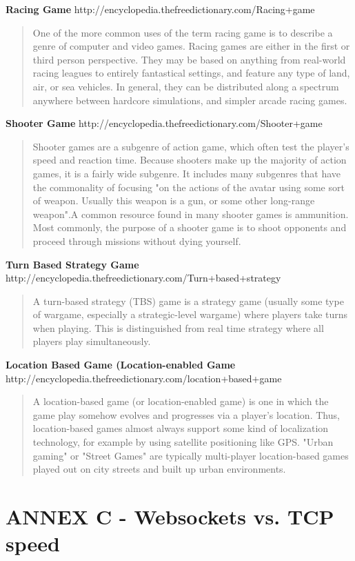 \documentclass{article}
\begin{document}
\textbf{Racing Game}
	http://encyclopedia.thefreedictionary.com/Racing+game
\begin{quote}
One of the more common uses of the term racing game is to describe a genre of
computer and video games. Racing games are either in the first or third person
perspective. They may be based on anything from real-world racing leagues to
entirely fantastical settings, and feature any type of land, air, or sea
vehicles. In general, they can be distributed along a spectrum anywhere between
hardcore simulations, and simpler arcade racing games.
\end{quote}
\textbf{Shooter Game}
	http://encyclopedia.thefreedictionary.com/Shooter+game
\begin{quote}
Shooter games are a subgenre of action game, which often test the player's speed
and reaction time. Because shooters make up the majority of action games, it is
a fairly wide subgenre. It includes many subgenres that have the commonality of
focusing "on the actions of the avatar using some sort of weapon. Usually this
weapon is a gun, or some other long-range weapon".A common resource found in
many shooter games is ammunition. Most commonly, the purpose of a shooter
game is to shoot opponents and proceed through missions without dying yourself.
\end{quote}
	
\textbf{Turn Based Strategy Game}
	http://encyclopedia.thefreedictionary.com/Turn+based+strategy
\begin{quote}
A turn-based strategy (TBS) game is a strategy game (usually some type of
wargame, especially a strategic-level wargame) where players take turns when
playing. This is distinguished from real time strategy where all players play
simultaneously.
\end{quote}

\textbf{Location Based Game (Location-enabled Game}
	http://encyclopedia.thefreedictionary.com/location+based+game
\begin{quote}
A location-based game (or location-enabled game) is one in which the game play
somehow evolves and progresses via a player's location. Thus, location-based
games almost always support some kind of localization technology, for example by
using satellite positioning like GPS. "Urban gaming" or "Street Games" are
typically multi-player location-based games played out on city streets and built
up urban environments.
\end{quote}


\section{ANNEX C - Websockets vs. TCP speed}
\end{document}
